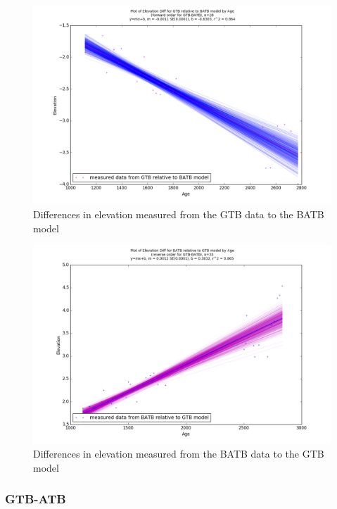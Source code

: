 \newpage

\begin{figure}[H]
	\includegraphics[width=0.9\linewidth]{data/bothNonZero/withinSeventyFivePercent/gias/theGIA_GTB_relative_to_BATB.png}
	\caption{Differences in elevation measured from the GTB data to the BATB model}
	\label{fig:gias_GTBxBATB}
\end{figure}
\newpage


\begin{figure}[H]
	\includegraphics[width=0.9\linewidth]{data/bothNonZero/withinSeventyFivePercent/gias/theGIA_BATB_relative_to_GTB.png}
	\caption{Differences in elevation measured from the BATB data to the GTB model}
	\label{fig:gias_BATBxGTB}
\end{figure}
\newpage







\subsubsection{GTB-ATB}

